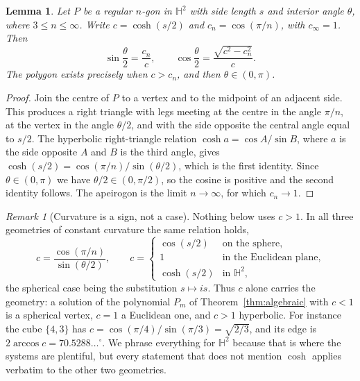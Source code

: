 \documentclass[11pt,a4paper]{article}
\theoremstyle{plain}
\newtheorem{lemma}[theorem]{Lemma}
\theoremstyle{definition}
\theoremstyle{remark}
\newtheorem{remark}[theorem]{Remark}
\newcommand{\HH}{\mathbb{H}^2}
\begin{document}
\begin{lemma}\label{lem:basic}
Let $P$ be a regular $n$-gon in $\HH$ with side length $s$ and interior angle
$\theta$, where $3\le n\le\infty$. Write $c=\cosh(s/2)$ and $c_n=\cos(\pi/n)$,
with $c_\infty=1$. Then
\begin{equation}\label{eq:basic}
  \sin\frac{\theta}{2}=\frac{c_n}{c},
  \qquad
  \cos\frac{\theta}{2}=\frac{\sqrt{c^{2}-c_n^{2}}}{c}.
\end{equation}
The polygon exists precisely when $c>c_n$, and then $\theta\in(0,\pi)$.
\end{lemma}

\begin{proof}
Join the centre of $P$ to a vertex and to the midpoint of an adjacent side. This
produces a right triangle with legs meeting at the centre in the angle $\pi/n$,
at the vertex in the angle $\theta/2$, and with the side opposite the central
angle equal to $s/2$. The hyperbolic right-triangle relation
$\cosh a=\cos A/\sin B$, where $a$ is the side opposite $A$ and $B$ is the third
angle, gives $\cosh(s/2)=\cos(\pi/n)/\sin(\theta/2)$, which is the first identity.
Since $\theta\in(0,\pi)$ we have $\theta/2\in(0,\pi/2)$, so the cosine is
positive and the second identity follows. The apeirogon is the limit $n\to\infty$,
for which $c_n\to1$.
\end{proof}

\begin{remark}[Curvature is a sign, not a case]\label{rem:curvature}
Nothing below uses $c>1$. In all three geometries of constant curvature the same
relation holds,
\[
  c=\frac{\cos(\pi/n)}{\sin(\theta/2)},
  \qquad
  c=\begin{cases}
      \cos(s/2) & \text{on the sphere},\\
      1         & \text{in the Euclidean plane},\\
      \cosh(s/2)& \text{in }\HH,
    \end{cases}
\]
the spherical case being the substitution $s\mapsto is$. Thus $c$ alone carries
the geometry: a solution of the polynomial $P_m$ of Theorem~\ref{thm:algebraic}
with $c<1$ is a spherical vertex, $c=1$ a Euclidean one, and $c>1$ hyperbolic.
For instance the cube $\{4,3\}$ has $c=\cos(\pi/4)/\sin(\pi/3)=\sqrt{2/3}$, and
its edge is $2\arccos c=70.5288\dots^{\circ}$. We phrase everything for $\HH$
because that is where the systems are plentiful, but every statement that does not
mention $\cosh$ applies verbatim to the other two geometries.
\end{remark}
\end{document}
